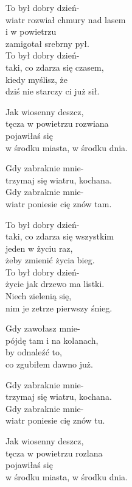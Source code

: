 \begin{text}
    To był dobry dzień-\\
    wiatr rozwiał chmury nad lasem\\
    i w powietrzu\\
    zamigotał srebrny pył.\\
    To był dobry dzień-\\
    taki, co zdarza się czasem,\\
    kiedy myślisz, że\\
    dziś nie starczy ci już sił.

    Jak wiosenny deszcz,\\
    tęcza w powietrzu rozwiana\\
    pojawiłaś się\\
    w środku miasta, w środku dnia.

    Gdy zabraknie mnie-\\
    trzymaj się wiatru, kochana.\\
    Gdy zabraknie mnie-\\
    wiatr poniesie cię znów tam.

    To był dobry dzień-\\
    taki, co zdarza się wszystkim\\
    jeden w życiu raz,\\
    żeby zmienić życia bieg.\\
    To był dobry dzień-\\
    życie jak drzewo ma listki.\\
    Niech zielenią się,\\
    nim je zetrze pierwszy śnieg.

    Gdy zawołasz mnie-\\
    pójdę tam i na kolanach,\\
    by odnaleźć to,\\
    co zgubiłem dawno już.

    Gdy zabraknie mnie-\\
    trzymaj się wiatru, kochana.\\
    Gdy zabraknie mnie-\\
    wiatr poniesie cię znów tu.

    Jak wiosenny deszcz,\\
    tęcza w powietrzu rozlana\\
    pojawiłaś się\\
    w środku miasta, w środku dnia.


\end{text}
